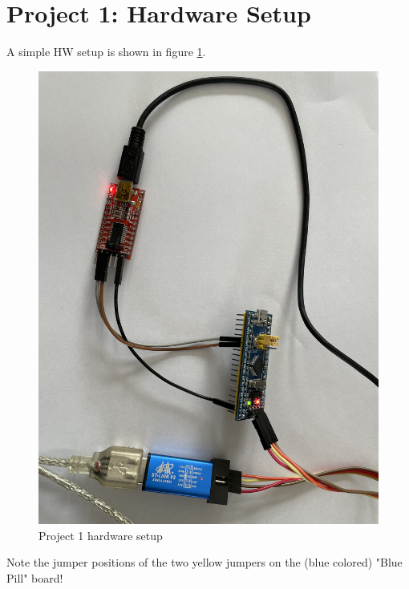 \documentclass[11pt, oneside]{scrartcl}   	%
\begin{document}
\section{Project 1: Hardware Setup}
A simple HW setup is shown in figure \ref{fig:HWSetup}.
\begin{figure}[htbp]
	\centering
	\includegraphics[width=1.0\linewidth]{Figures/HardwareSetup_BluePill+STLinkV2+USBSerialAdapter.jpeg}
	\caption{Project 1 hardware setup}
	\label{fig:HWSetup}
\end{figure}

Note the jumper positions of the two yellow jumpers on the (blue colored) "Blue Pill" board!\\
\end{document}
